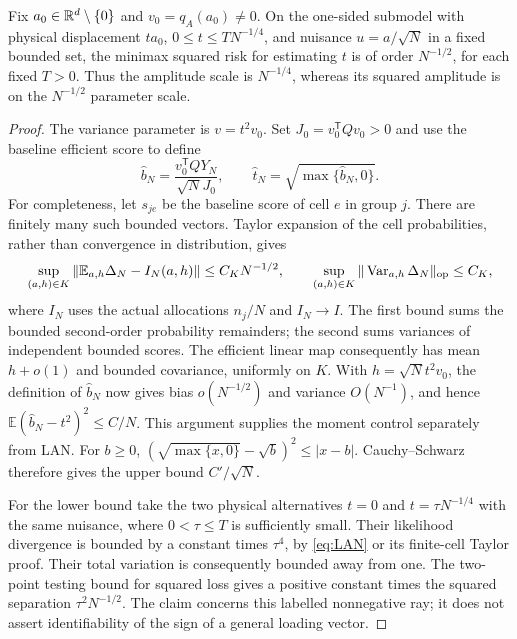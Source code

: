 \begin{corollary}\label{cor:root-rate}
Fix $a_0\in\mathbb R^d\setminus\{0\}$ and $v_0=q_A(a_0)\ne0$. On the one-sided submodel with physical displacement $t a_0$, $0\le t\le T N^{-1/4}$, and nuisance $u=a/\sqrt N$ in a fixed bounded set, the minimax squared risk for estimating $t$ is of order $N^{-1/2}$, for each fixed $T>0$. Thus the amplitude scale is $N^{-1/4}$, whereas its squared amplitude is on the $N^{-1/2}$ parameter scale.
\end{corollary}
\begin{proof}
The variance parameter is $v=t^2v_0$. Set $J_0=v_0^{\mathsf T}Qv_0>0$ and use the baseline efficient score to define
\[
 \widehat b_N=\frac{v_0^{\mathsf T}QY_N}{\sqrt N J_0},\qquad
 \widehat t_N=\sqrt{\max\{\widehat b_N,0\}}.
\]
For completeness, let $s_{je}$ be the baseline score of cell $e$ in group $j$. There are finitely many such bounded vectors. Taylor expansion of the cell probabilities, rather than convergence in distribution, gives
\[
 \sup_{(a,h)\in K}\|\mathbb E_{a,h}\Delta_N-I_N(a,h)\|
       \le C_KN^{-1/2},\qquad
 \sup_{(a,h)\in K}\|\operatorname{Var}_{a,h}\Delta_N\|_{\rm op}
       \le C_K,
\]
where $I_N$ uses the actual allocations $n_j/N$ and $I_N\to I$. The first bound sums the bounded second-order probability remainders; the second sums variances of independent bounded scores. The efficient linear map consequently has mean $h+o(1)$ and bounded covariance, uniformly on $K$. With $h=\sqrt N t^2v_0$, the definition of $\widehat b_N$ now gives bias $o(N^{-1/2})$ and variance $O(N^{-1})$, and hence
$\mathbb E(\widehat b_N-t^2)^2\le C/N$.
This argument supplies the moment control separately from LAN. For $b\ge0$,
$(\sqrt{\max\{x,0\}}-\sqrt b)^2\le|x-b|$.
Cauchy--Schwarz therefore gives the upper bound $C'/\sqrt N$.

For the lower bound take the two physical alternatives $t=0$ and $t=\tau N^{-1/4}$ with the same nuisance, where $0<\tau\le T$ is sufficiently small. Their likelihood divergence is bounded by a constant times $\tau^4$, by \eqref{eq:LAN} or its finite-cell Taylor proof. Their total variation is consequently bounded away from one. The two-point testing bound for squared loss gives a positive constant times the squared separation $\tau^2N^{-1/2}$. The claim concerns this labelled nonnegative ray; it does not assert identifiability of the sign of a general loading vector.
\end{proof}

